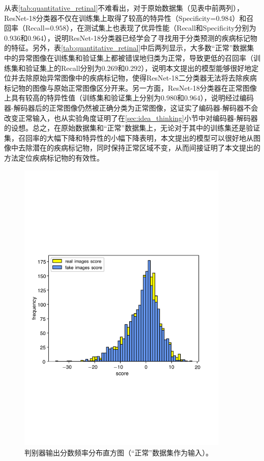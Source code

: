 从表\ref{tab:quantitative_retinal}不难看出，对于原始数据集（见表中前两列），ResNet-18分类器不仅在训练集上取得了较高的特异性（Specificity=$0.984$）和召回率（Recall=$0.958$），在测试集上也表现了优异性能（Recall和Specificity分别为$0.936$和$0.964$），说明ResNet-18分类器已经学会了寻找用于分类预测的疾病标记物的特征。另外，表\ref{tab:quantitative_retinal}中后两列显示，大多数“正常”数据集中的异常图像在训练集和验证集上都被错误地归类为正常，导致更低的召回率（训练集和验证集上的Recall分别为$0.269$和$0.292$），说明本文提出的模型能够很好地定位并去除原始异常图像中的疾病标记物，使得ResNet-18二分类器无法将去除疾病标记物的图像与原始正常图像区分开来。另一方面，ResNet-18分类器在正常图像上具有较高的特异性值（训练集和验证集上分别为$0.980$和$0.964$），说明经过编码器-解码器后的正常图像仍然被正确分类为正常图像，这证实了编码器-解码器不会改变正常输入，也从实验角度证明了在\ref{sec:idea_thinking}小节中对编码器-解码器的设想。总之，在原始数据集和“正常”数据集上，无论对于其中的训练集还是验证集，召回率的大幅下降和特异性的小幅下降表明，本文提出的模型可以很好地从图像中去除潜在的疾病标记物，同时保持正常区域不变，从而间接证明了本文提出的方法定位疾病标记物的有效性。
\begin{figure}[h]
	\centering
	\includegraphics[width=0.9\textwidth]{figure/score_distribution}
	\caption[判别器输出分数频率分布直方图（“正常”数据集作为输入）]{判别器输出分数频率分布直方图（“正常”数据集作为输入）。}
	\label{fig:hist_freq}
\end{figure}

